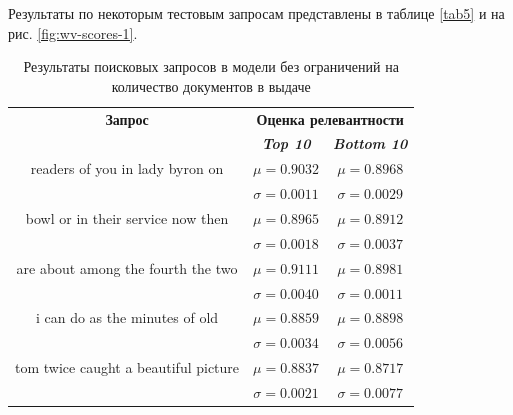 Результаты по некоторым тестовым запросам представлены в таблице \ref{tab5} и на рис. \ref{fig:wv-scores-1}.

\begin{table}[tbp]
    \caption{Результаты поисковых запросов в модели без ограничений на количество документов в выдаче}
    \begin{center}
        \begin{tabular}{ccc}
            \toprule
            \textbf{Запрос} & \multicolumn{2}{c}{\textbf{Оценка релевантности}}                               \\
                            & \textbf{\textit{Top 10}}                          & \textbf{\textit{Bottom 10}} \\
            \midrule
            readers of you in lady byron on           & \(\mu=0.9032\)                                    & \(\mu=0.8968\)              \\
                                                      & \(\sigma=0.0011\)                                 & \(\sigma=0.0029\)           \\
            \midrule
            bowl or in their service  now then        & \(\mu=0.8965\)                                    & \(\mu=0.8912\)              \\
                                                      & \(\sigma=0.0018\)                                 & \(\sigma=0.0037\)           \\
            \midrule
            are about among the fourth the two        & \(\mu=0.9111\)                                    & \(\mu=0.8981\)              \\
                                                      & \(\sigma=0.0040\)                                 & \(\sigma=0.0011\)           \\
            \midrule
            i can do as the minutes of old            & \(\mu=0.8859\)                                    & \(\mu=0.8898\)              \\
                                                      & \(\sigma=0.0034\)                                 & \(\sigma=0.0056\)           \\
            \midrule
            tom twice caught a beautiful picture      & \(\mu=0.8837\)                                    & \(\mu=0.8717\)              \\
                                                      & \(\sigma=0.0021\)                                 & \(\sigma=0.0077\)           \\

\end{tabular}
\end{center}
\end{table}
